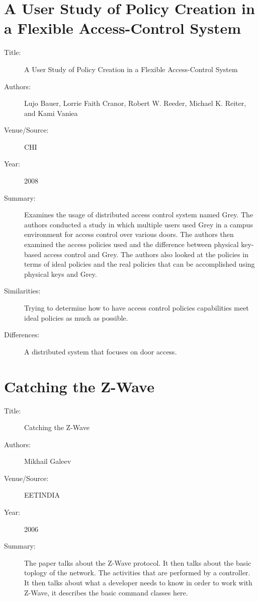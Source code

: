 \documentclass[letterpaper,12pt]{article}
\begin{document}
\section{A User Study of Policy Creation in a Flexible Access-Control System~\cite{policyCreation}}
\begin{description}
 \item[Title:] A User Study of Policy Creation in a Flexible Access-Control System
 \item[Authors:] Lujo Bauer, Lorrie Faith Cranor, Robert W. Reeder, Michael K. Reiter, and Kami Vaniea
 \item[Venue/Source:] CHI
 \item[Year:] 2008
 \item[Summary:] Examines the usage of distributed access control system named Grey.  The authors conducted a study in which multiple users used Grey in a campus environment for access control over various doors.  The authors then examined the access policies used and the difference between physical key-based access control and Grey.  The authors also looked at the policies in terms of ideal policies and the real policies that can be accomplished using physical keys and Grey.
 \item[Similarities:] Trying to determine how to have access control policies capabilities meet ideal policies as much as possible.
 \item[Differences:] A distributed system that focuses on door access.
\end{description}

\section{Catching the Z-Wave~\cite{zwavebasics}}
\begin{description}
 \item[Title:] Catching the Z-Wave
 \item[Authors:] Mikhail Galeev
 \item[Venue/Source:] EETINDIA
 \item[Year:] 2006
 \item[Summary:] The paper talks about the Z-Wave protocol. It then talks about the basic toplogy of the network. The activities that are performed by a controller. It then talks about what a developer needs to know in order to work with Z-Wave, it describes the basic command classes here.
\end{description}
\end{document}
